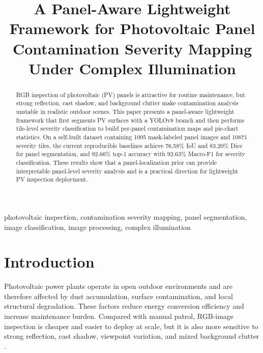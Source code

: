 \documentclass[conference]{IEEEtran}
\newcommand{\SegTotal}{1095}
\newcommand{\ClsTotal}{10871}
\newcommand{\SegIoU}{76.58}
\newcommand{\SegDice}{83.20}
\newcommand{\ClsAcc}{92.66}
\newcommand{\ClsMacroF}{92.63}
\begin{document}
\title{A Panel-Aware Lightweight Framework for Photovoltaic Panel Contamination Severity Mapping Under Complex Illumination}

\author{
}

\maketitle

\begin{abstract}
RGB inspection of photovoltaic (PV) panels is attractive for routine maintenance, but strong reflection, cast shadow, and background clutter make contamination analysis unstable in realistic outdoor scenes. This paper presents a panel-aware lightweight framework that first segments PV surfaces with a YOLOv8 branch and then performs tile-level severity classification to build per-panel contamination maps and pie-chart statistics. On a self-built dataset containing \SegTotal{} mask-labeled panel images and \ClsTotal{} severity tiles, the current reproducible baselines achieve \SegIoU{}\% IoU and \SegDice{}\% Dice for panel segmentation, and \ClsAcc{}\% top-1 accuracy with \ClsMacroF{}\% Macro-F1 for severity classification. These results show that a panel-localization prior can provide interpretable panel-level severity analysis and is a practical direction for lightweight PV inspection deployment.
\end{abstract}

\begin{IEEEkeywords}
photovoltaic inspection, contamination severity mapping, panel segmentation, image classification, image processing, complex illumination
\end{IEEEkeywords}

\section{Introduction}
Photovoltaic power plants operate in open outdoor environments and are therefore affected by dust accumulation, surface contamination, and local structural degradation. These factors reduce energy conversion efficiency and increase maintenance burden. Compared with manual patrol, RGB-image inspection is cheaper and easier to deploy at scale, but it is also more sensitive to strong reflection, cast shadow, viewpoint variation, and mixed background clutter \cite{ref_review,ref_rgbsoiling,ref_uavfault}.
\end{document}

